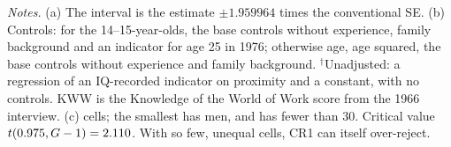 \begin{table}[tbp]
\smallskip
\begin{minipage}{0.95\linewidth}
\footnotesize
\emph{Notes.} (a) The interval is the estimate $\pm 1.959964$ times the conventional SE.
(b) Controls: for the 14--15-year-olds, the base controls without experience, family
background and an indicator for age 25 in 1976; otherwise age, age squared, the base
controls without experience and family background. $^{\dagger}$Unadjusted: a regression of
an IQ-recorded indicator on proximity and a constant, with no controls. KWW is the Knowledge of the World of
Work score from the 1966 interview. (c) \NClusters{} cells; the smallest has
\MinClusterSize{} men, and \NClustersUnderThirty{} has fewer than 30. Critical value
$t(0.975, G-1) = 2.110{}$. With so few, unequal cells, CR1 can itself over-reject.
\end{minipage}
\end{table}

